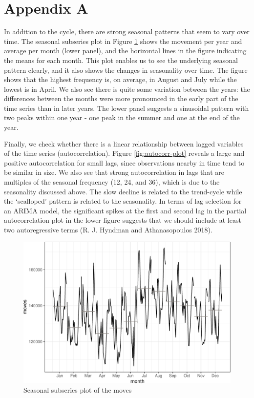 \documentclass[]{article}
\begin{document}
\section{Appendix A}\label{appendix-a}

In addition to the cycle, there are strong seasonal patterns that seem
to vary over time. The seasonal subseries plot in Figure
\ref{fig:freq-month-plot} shows the movement per year and average per
month (lower panel), and the horizontal lines in the figure indicating
the means for each month. This plot enables us to see the underlying
seasonal pattern clearly, and it also shows the changes in seasonality
over time. The figure shows that the highest frequency is, on average,
in August and July while the lowest is in April. We also see there is
quite some variation between the years: the differences between the
months were more pronounced in the early part of the time series than in
later years. The lower panel suggests a sinusoidal pattern with two
peaks within one year - one peak in the summer and one at the end of the
year.

Finally, we check whether there is a linear relationship between lagged
variables of the time series (autocorrelation). Figure
\ref{fig:autocorr-plot} reveals a large and positive autocorrelation for
small lags, since observations nearby in time tend to be similar in
size. We also see that strong autocorrelation in lags that are multiples
of the seasonal frequency (12, 24, and 36), which is due to the
seasonality discussed above. The slow decline is related to the
trend-cycle while the `scalloped' pattern is related to the seasonality.
In terms of lag selection for an ARIMA model, the significant spikes at
the first and second lag in the partial autocorrelation plot in the
lower figure suggests that we should include at least two autoregressive
terms (R. J. Hyndman and Athanasopoulos 2018).

\begin{figure}
\centering
\includegraphics{../figs/freq--freq-month-plot-1.pdf}
\caption{\label{fig:freq-month-plot}Seasonal subseries plot of the moves}
\end{figure}
\end{document}
